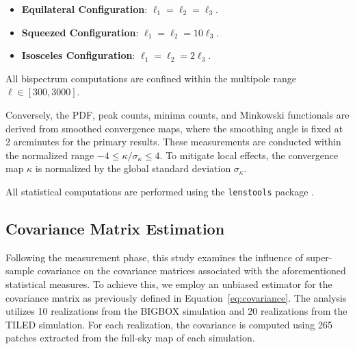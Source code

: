 \begin{itemize}
    \item \textbf{Equilateral Configuration}: $\ell_1 = \ell_2 = \ell_3$.
    \item \textbf{Squeezed Configuration}: $\ell_1 = \ell_2 = 10\ell_3$.
    \item \textbf{Isosceles Configuration}: $\ell_1 = \ell_2 = 2\ell_3$.
\end{itemize}
All bispectrum computations are confined within the multipole range $\ell \in [300, 3000]$.

Conversely, the PDF, peak counts, minima counts, and Minkowski functionals are derived from smoothed convergence maps, where the smoothing angle is fixed at 2 arcminutes for the primary results. These measurements are conducted within the normalized range $-4 \leq \kappa/\sigma_{\kappa} \leq 4$. To mitigate local effects, the convergence map $\kappa$ is normalized by the global standard deviation $\sigma_{\kappa}$.

All statistical computations are performed using the \texttt{lenstools} package \citep{2016A&C....17...73P}.

\subsection{Covariance Matrix Estimation}
Following the measurement phase, this study examines the influence of super-sample covariance on the covariance matrices associated with the aforementioned statistical measures. To achieve this, we employ an unbiased estimator for the covariance matrix as previously defined in Equation~\ref{eq:covariance}. The analysis utilizes 10 realizations from the BIGBOX simulation and 20 realizations from the TILED simulation. For each realization, the covariance is computed using 265 patches extracted from the full-sky map of each simulation.

